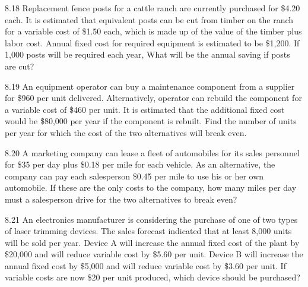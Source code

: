 \begin{exsol@exercise}{8.18}
    \label{sea-8-18}
        Replacement fence posts for a cattle ranch are currently purchased for \$4.20 each. It is estimated that equivalent posts can be cut from timber on the ranch for a variable cost of \$1.50 each, which is made up of the value of the timber plus labor cost. Annual fixed cost for required equipment is estimated to be \$1,200. If 1,000 posts will be required each year, What will be the annual saving if posts are cut?
\end{exsol@exercise}
\begin{exsol@solution}{}
\end{exsol@solution}
\begin{exsol@exercise}{8.19}
    \label{sea-8-19}
        An equipment operator can buy a maintenance component from a supplier for \$960 per unit delivered. Alternatively, operator can rebuild the component for a variable cost of \$460 per unit. It is estimated that the additional fixed cost would be \$80,000 per year if the component is rebuilt. Find the number of units per year for which the cost of the two alternatives will break even.
\end{exsol@exercise}
\begin{exsol@solution}{}
\end{exsol@solution}
\begin{exsol@exercise}{8.20}
    \label{sea-8-20}
        A marketing company can lease a fleet of automobiles for its sales personnel for \$35 per day plus \$0.18 per mile for each vehicle. As an alternative, the company can pay each salesperson \$0.45 per mile to use his or her own automobile. If these are the only costs to the company, how many miles per day must a salesperson drive for the two alternatives to break even?
\end{exsol@exercise}
\begin{exsol@solution}{}
\end{exsol@solution}
\begin{exsol@exercise}{8.21}
    \label{sea-8-21}
        An electronics manufacturer is considering the purchase of one of two types of laser trimming devices. The sales forecast indicated that at least 8,000 units will be sold per year. Device A will increase the annual fixed cost of the plant by \$20,000 and will reduce variable cost by \$5.60 per unit. Device B will increase the annual fixed cost by \$5,000 and will reduce variable cost by \$3.60 per unit. If variable costs are now \$20 per unit produced, which device should be purchased?
\end{exsol@exercise}
